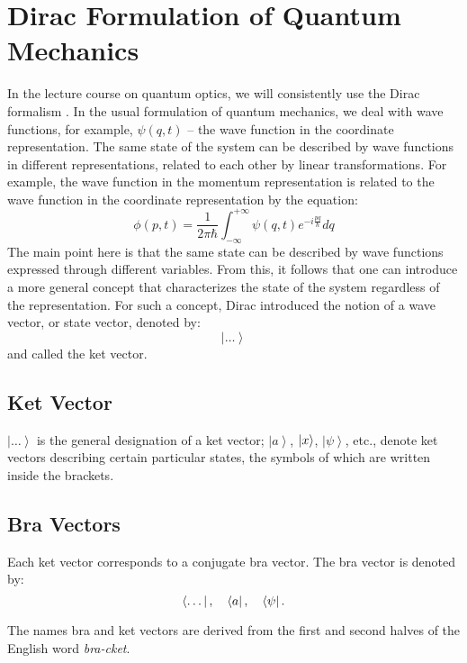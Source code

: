 \section{Dirac Formulation of Quantum Mechanics}
\label{AddDirac}
In the lecture course on quantum optics, we will consistently use the Dirac formalism \cite{bDiracPrincipleQuantumMechanic}. In the usual formulation of quantum mechanics, we deal with wave functions, for example, $\psi\left(q, t\right)$ – the wave function in the coordinate representation. The same state of the system can be described by wave functions in different representations, related to each other by linear transformations. For example, the wave function in the momentum representation is related to the wave function in the coordinate representation by the equation:
\begin{equation}
\phi\left(p, t\right) = \frac{1}{2 \pi \hbar} \int_{-\infty}^{+\infty}
\psi \left(q, t\right) e^{-i \frac{p q}{\hbar}} dq
\end{equation}
The main point here is that the same state can be described by wave functions expressed through different variables. From this, it follows that one can introduce a more general concept that characterizes the state of the system regardless of the representation. For such a concept, Dirac introduced the notion of a wave vector, or state vector, denoted by:
\begin{equation}
\left| \dots \right>
\end{equation}
and called the ket vector.

\subsection{Ket Vector}
$\left| \dots \right>$ is the general designation of a ket vector; $\left| a \right>$, $\ket{ x }$, $\left| \psi \right>$, etc., denote ket vectors describing certain particular states, the symbols of which are written inside the brackets.

\subsection{Bra Vectors}
Each ket vector corresponds to a conjugate bra vector. The bra vector is denoted by:
\begin{equation}
\left< \dots \right|, \quad 
\bra{ a }, \quad  
\left< \psi \right|.
\end{equation}

The names bra and ket vectors are derived from the first and second halves of the English word {\itshape bra-cket}.

